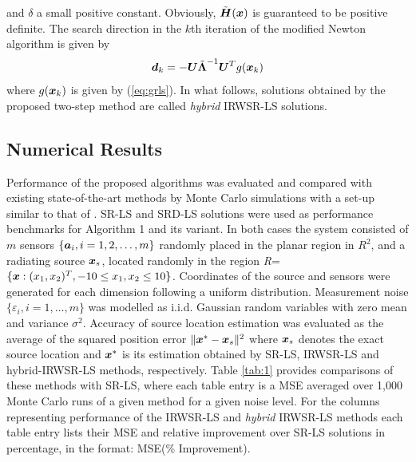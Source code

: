 and $\delta$ a small positive constant. Obviously, $\tilde{\mbox{\boldmath$H$}}(\mbox{\boldmath$x$})$ is guaranteed to be positive definite. The search direction in the $k$th iteration of the modified Newton algorithm is given by 
\begin{equation}
\nonumber
\mbox{\boldmath$d$}_k = - \mbox{\boldmath$U$}\tilde{\mbox{\boldmath{$\Lambda$}}}^{-1}\mbox{\boldmath$U$}^T g(\mbox{\boldmath$x$}_k)
\end{equation}
where $g(\mbox{\boldmath$x$}_k)$ is given by (\ref{eq:grls}). In what follows, solutions obtained by the proposed two-step method are called \textit{hybrid} IRWSR-LS solutions.

\subsection{Numerical Results}


Performance of the proposed algorithms was evaluated and compared with existing state-of-the-art methods by Monte Carlo simulations with a set-up similar to that of \cite{BeckStLi}. SR-LS and SRD-LS solutions were used as performance benchmarks for Algorithm 1 and its variant. In both cases the system consisted of $m$ sensors $\{\mbox{\boldmath$a$}_i, i=1, 2,\ldots,m\}$ randomly placed in the planar region in $R^2$, and a radiating source $\mbox{\boldmath$x$}_s$, located randomly in the region \textit{R}=$\{\mbox{\boldmath$x$}:(x_1,x_2)^T, -10\leq x_1,x_2\leq 10\}$. Coordinates of the source and sensors were generated for each dimension following a uniform distribution. Measurement noise $\{\varepsilon_i, i=1,\ldots,m\}$ was modelled as i.i.d. Gaussian random variables with zero mean and variance $\sigma^2$. Accuracy of source location estimation was evaluated as the average of the squared position error $\|\mbox{\boldmath$x$}^* - \mbox{\boldmath$x$}_s\|^2$ where $\mbox{\boldmath$x$}_s$ denotes the exact source location and $\mbox{\boldmath$x$}^*$ is its estimation obtained by SR-LS, IRWSR-LS and hybrid-IRWSR-LS methods, respectively. Table \ref{tab:1} provides comparisons of these methods with SR-LS, where each table entry is a MSE averaged over 1,000 Monte Carlo runs of a given method for a given noise level. For the columns representing performance of the IRWSR-LS and \textit{hybrid} IRWSR-LS methods each table entry lists their MSE and relative improvement over SR-LS solutions in percentage, in the format: MSE($\%$ Improvement). 


